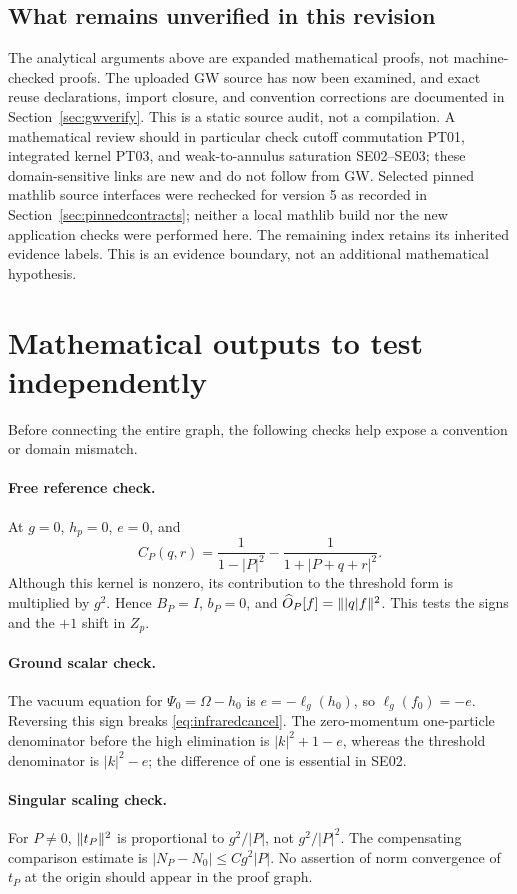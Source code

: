 \documentclass[11pt,a4paper]{article}
\theoremstyle{remark}\newtheorem{remark}[theorem]{Remark}
\newcommand{\abs}[1]{\lvert #1\rvert}\newcommand{\rankone}[2]{\lvert #1\rangle\langle #2\rvert}
\begin{document}
\subsection{What remains unverified in this revision}
The analytical arguments above are expanded mathematical proofs, not machine-checked proofs. The uploaded GW source has now been examined, and exact reuse declarations, import closure, and convention corrections are documented in Section~\ref{sec:gwverify}. This is a static source audit, not a compilation. A mathematical review should in particular check cutoff commutation PT01, integrated kernel PT03, and weak-to-annulus saturation SE02--SE03; these domain-sensitive links are new and do not follow from GW. Selected pinned mathlib source interfaces were rechecked for version 5 as recorded in Section~\ref{sec:pinnedcontracts}; neither a local mathlib build nor the new application checks were performed here. The remaining index retains its inherited evidence labels. This is an evidence boundary, not an additional mathematical hypothesis.

\section{Mathematical outputs to test independently}
Before connecting the entire graph, the following checks help expose a convention or domain mismatch.

\paragraph{Free reference check.}
At $g=0$, $h_p=0$, $e=0$, and
\[
 C_P(q,r)=\frac1{1-\abs P^2}-\frac1{1+\abs{P+q+r}^2}.
\]
Although this kernel is nonzero, its contribution to the threshold form is multiplied by $g^2$. Hence $B_P=I$, $b_P=0$, and $\widehat O_P[f]=\norm{\abs q f}^2$. This tests the signs and the $+1$ shift in $Z_p$.

\paragraph{Ground scalar check.}
The vacuum equation for $\Psi_0=\Omega-h_0$ is $e=-\ell_g(h_0)$, so $\ell_g(f_0)=-e$. Reversing this sign breaks \eqref{eq:infraredcancel}. The zero-momentum one-particle denominator before the high elimination is $\abs k^2+1-e$, whereas the threshold denominator is $\abs k^2-e$; the difference of one is essential in SE02.

\paragraph{Singular scaling check.}
For $P\ne0$, $\lVert t_P\rVert^2$ is proportional to $g^2/\abs P$, not $g^2/\abs P^2$. The compensating comparison estimate is $\abs{N_P-N_0}\leq Cg^2\abs P$. No assertion of norm convergence of $t_P$ at the origin should appear in the proof graph.
\end{document}
